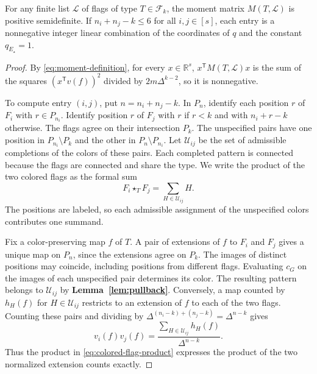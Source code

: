 \begin{lemma}\label{lem:moment}
For any finite list $\mathcal L$ of flags of type $T\in\mathcal F_k$,
the moment matrix $M(T,\mathcal L)$ is positive semidefinite.
If $n_i+n_j-k\leq6$ for all $i,j\in[s]$, each entry is a nonnegative
integer linear combination of the coordinates of $q$ and the
constant $q_{E_\star}=1$.
\end{lemma}

\begin{proof}
By \eqref{eq:moment-definition}, for every $x\in\mathbb R^s$,
$x^{\mathsf T}M(T,\mathcal L)x$ is the sum of the squares
$(x^{\mathsf T}v(f))^2$ divided by $2m\Delta^{k-2}$, so it is
nonnegative.

To compute entry $(i,j)$, put $n=n_i+n_j-k$. In $P_n$, identify each position $r$ of $F_i$ with $r\in P_{n_i}$.
Identify position $r$ of $F_j$ with $r$ if $r<k$ and with $n_i+r-k$
otherwise. The flags agree on their intersection
$P_k$. The unspecified pairs have one position in
$P_{n_i}\setminus P_k$ and the other in $P_n\setminus P_{n_i}$.
Let $\mathcal U_{ij}$ be the set of admissible completions of the
colors of these pairs. Each completed pattern is connected because
the flags are connected and share the type. We write the product of
the two colored flags as the formal sum
\begin{equation}\label{eq:colored-flag-product}
 F_i\star_T F_j=\sum_{H\in\mathcal U_{ij}}H.
\end{equation}
The positions are labeled, so each admissible assignment of
the unspecified colors contributes one summand.

Fix a color-preserving map $f$ of $T$. A pair of extensions of $f$
to $F_i$ and $F_j$ gives a unique map on $P_n$, since the extensions
agree on $P_k$. The images of distinct positions may coincide,
including positions from different flags. Evaluating $c_G$ on the
images of each unspecified pair determines its color. The resulting
pattern belongs to $\mathcal U_{ij}$ by
\textbf{Lemma~\ref{lem:pullback}}. Conversely, a map counted by
$h_H(f)$ for $H\in\mathcal U_{ij}$ restricts to an extension of $f$
to each of the two flags. Counting these pairs and dividing by
$\Delta^{(n_i-k)+(n_j-k)}=\Delta^{n-k}$ gives
\begin{equation}\label{eq:colored-flag-evaluation}
 v_i(f)v_j(f)=\frac{\displaystyle\sum_{H\in\mathcal U_{ij}}h_H(f)}
                         {\Delta^{n-k}}.
\end{equation}
Thus the product in \eqref{eq:colored-flag-product} expresses the
product of the two normalized extension counts exactly.


\end{proof}
